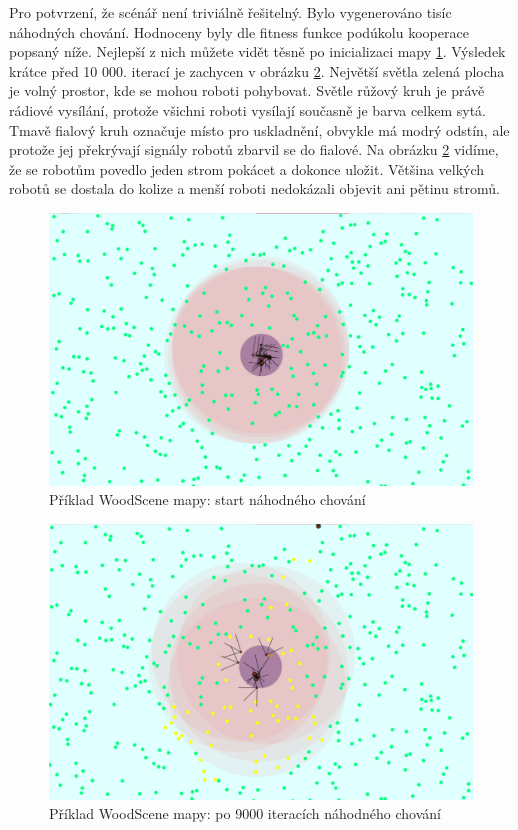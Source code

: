 \par
Pro potvrzení, že scénář není triviálně řešitelný. Bylo vygenerováno tisíc náhodných chování. Hodnoceny byly dle fitness funkce podúkolu kooperace popsaný níže. Nejlepší z nich můžete vidět těsně po inicializaci mapy \ref{obr04:WoodSceneRandomStart}. Výsledek krátce před 10 000. iterací je zachycen v obrázku \ref{obr04:WoodSceneRandomEnd}. Největší světla zelená plocha je volný prostor, kde se mohou roboti pohybovat. Světle růžový kruh je právě rádiové vysílání, protože všichni roboti vysílají současně je barva celkem sytá. Tmavě fialový kruh označuje místo pro uskladnění, obvykle má modrý odstín, ale protože jej překrývají signály robotů zbarvil se do fialové. Na obrázku \ref{obr04:WoodSceneRandomEnd} vidíme, že se robotům povedlo jeden strom pokácet a dokonce uložit. Většina velkých robotů se dostala do kolize a menší roboti nedokázali objevit ani pětinu stromů.
\begin{figure}[p]\centering
	\includegraphics[width=\columnwidth]{../img/WoodMap/pictures/StartRandom.png}
	\caption{Příklad WoodScene mapy: start náhodného chování}
	\label{obr04:WoodSceneRandomStart}
\end{figure}
\par
\begin{figure}[p]\centering
	\includegraphics[width=\columnwidth]{../img/WoodMap/pictures/EndRandom.png}
	\caption{Příklad WoodScene mapy: po 9000 iteracích náhodného chování}
	\label{obr04:WoodSceneRandomEnd}
\end{figure}
\clearpage

